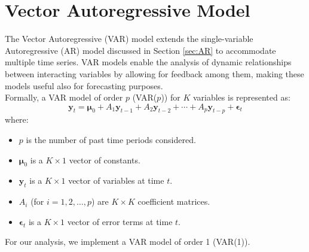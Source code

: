 \section{Vector Autoregressive Model}
\label{sec:VAR}
The Vector Autoregressive (VAR) model extends the single-variable Autoregressive (AR) model discussed in Section \ref{sec:AR} to accommodate multiple time series. VAR models enable the analysis of dynamic relationships between interacting variables by allowing for feedback among them, making these models useful also for forecasting purposes. \\
Formally, a VAR model of order $p$ (VAR($p$)) for $K$ variables is represented as:
\begin{equation}
    \mathbf{y}_t = \bm{\mu}_0 + A_1 \mathbf{y}_{t-1} + A_2 \mathbf{y}_{t-2} + \cdots + A_p \mathbf{y}_{t-p} + \bm{\epsilon}_t
\end{equation}
where:
\begin{itemize}
    \item $p$ is the number of past time periods considered.
    \item $\bm{\mu}_0$ is a $K \times 1$ vector of constants.
    \item $\mathbf{y}_t$ is a $K \times 1$ vector of variables at time $t$.
    \item $A_i$ (for $i = 1, 2, \ldots, p$) are $K \times K$ coefficient matrices.
    \item $\bm{\epsilon}_t$ is a $K \times 1$ vector of error terms at time $t$.
\end{itemize}
For our analysis, we implement a VAR model of order 1 (VAR(1)).
